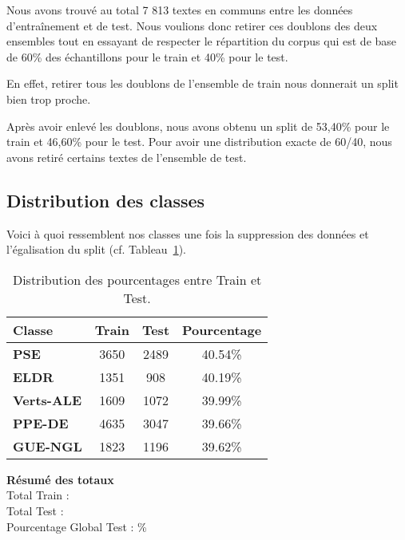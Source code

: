\documentclass[11pt]{article}
\begin{document}
Nous avons trouvé au total 7 813 textes en communs entre les données d'entraînement et de test. Nous voulions donc retirer ces doublons des deux ensembles tout en essayant de respecter le répartition du corpus qui est de base de 60\% des échantillons pour le train et 40\% pour le test. 

En effet, retirer tous les doublons de l'ensemble de train nous donnerait un split bien trop proche.

Après avoir enlevé les doublons, nous avons obtenu un split de 53,40\% pour le train et 46,60\% pour le test. Pour avoir une distribution exacte de 60/40, nous avons retiré certains textes de l'ensemble de test.

\subsection{Distribution des classes}
Voici à quoi ressemblent nos classes une fois la suppression des données et l'égalisation du split (cf. Tableau~\ref{tab:pourcentage_test}).

\begin{table}[ht]
\centering
    \begin{tabular}{lccc}
        \toprule
        \textbf{Classe}   & \textbf{Train} & \textbf{Test} & \textbf{Pourcentage} \\ \midrule
        \textbf{PSE}      & 3650           & 2489          & 40.54\% \\    
        \textbf{ELDR}     & 1351           & 908           & 40.19\% \\          
        \textbf{Verts-ALE}& 1609           & 1072          & 39.99\% \\          
        \textbf{PPE-DE}   & 4635           & 3047          & 39.66\% \\          
        \textbf{GUE-NGL}  & 1823           & 1196          & 39.62\%  \\ \bottomrule            
    \end{tabular}
    \caption{Distribution des pourcentages entre Train et Test.}
    \label{tab:pourcentage_test} %
\end{table}

\textbf{Résumé des totaux} \\
Total Train :  \\
Total Test  :  \\
Pourcentage Global Test : \%
\\
\end{document}
